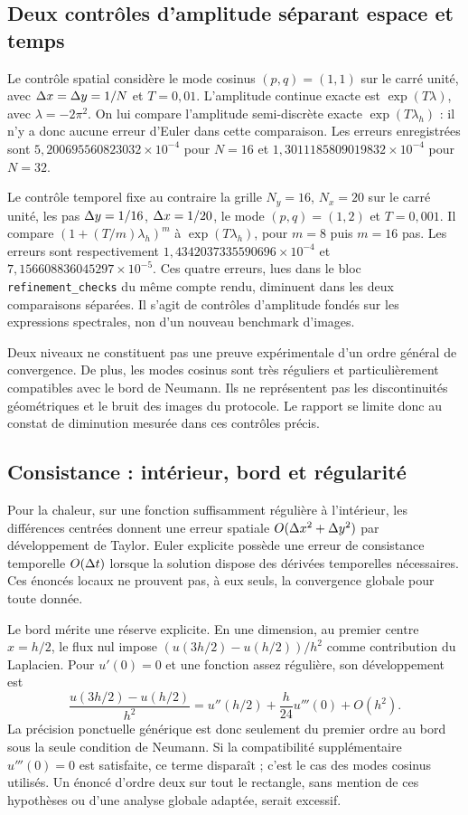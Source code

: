 \subsection{Deux contrôles d'amplitude séparant espace et temps}

Le contrôle spatial considère le mode cosinus $(p,q)=(1,1)$ sur le
carré unité, avec $\Delta x=\Delta y=1/N$ et $T=0{,}01$.
L'amplitude continue exacte est $\exp(T\lambda)$, avec
$\lambda=-2\pi^2$. On lui compare l'amplitude semi-discrète exacte
$\exp(T\lambda_h)$ : il n'y a donc aucune erreur d'Euler dans cette
comparaison. Les erreurs enregistrées sont
$5{,}200695560823032\times10^{-4}$ pour $N=16$ et
$1{,}3011185809019832\times10^{-4}$ pour $N=32$.

Le contrôle temporel fixe au contraire la grille $N_y=16$, $N_x=20$
sur le carré unité, les pas $\Delta y=1/16$, $\Delta x=1/20$, le mode
$(p,q)=(1,2)$ et $T=0{,}001$. Il compare
$(1+(T/m)\lambda_h)^m$ à $\exp(T\lambda_h)$, pour $m=8$ puis
$m=16$ pas. Les erreurs sont respectivement
$1{,}4342037335590696\times10^{-4}$ et
$7{,}156608836045297\times10^{-5}$.
Ces quatre erreurs, lues dans le bloc \texttt{refinement\_checks}
du même compte rendu, diminuent dans les deux comparaisons séparées.
Il s'agit de contrôles d'amplitude fondés sur les expressions
spectrales, non d'un nouveau benchmark d'images.

Deux niveaux ne constituent pas une preuve expérimentale d'un ordre
général de convergence. De plus, les modes cosinus sont très réguliers
et particulièrement compatibles avec le bord de Neumann. Ils ne
représentent pas les discontinuités géométriques et le bruit des images
du protocole. Le rapport se limite donc au constat de diminution
mesurée dans ces contrôles précis.

\subsection{Consistance : intérieur, bord et régularité}

Pour la chaleur, sur une fonction suffisamment régulière à l'intérieur,
les différences centrées donnent une erreur spatiale
$O(\Delta x^2+\Delta y^2)$ par développement de Taylor. Euler explicite possède
une erreur de consistance temporelle $O(\Delta t)$ lorsque la solution
dispose des dérivées temporelles nécessaires. Ces énoncés locaux ne
prouvent pas, à eux seuls, la convergence globale pour toute donnée.

Le bord mérite une réserve explicite. En une dimension, au premier
centre $x=h/2$, le flux nul impose
$(u(3h/2)-u(h/2))/h^2$ comme contribution du Laplacien.
Pour $u'(0)=0$ et une fonction assez régulière, son développement est
\begin{equation}
 \frac{u(3h/2)-u(h/2)}{h^2}
 =u''(h/2)+\frac{h}{24}u'''(0)+O(h^2).
 \label{eq:boundary-consistency}
\end{equation}
La précision ponctuelle générique est donc seulement du premier
ordre au bord sous la seule condition de Neumann. Si la compatibilité
supplémentaire $u'''(0)=0$ est satisfaite, ce terme disparaît ; c'est
le cas des modes cosinus utilisés. Un énoncé d'ordre deux sur tout
le rectangle, sans mention de ces hypothèses ou d'une analyse globale
adaptée, serait excessif.

